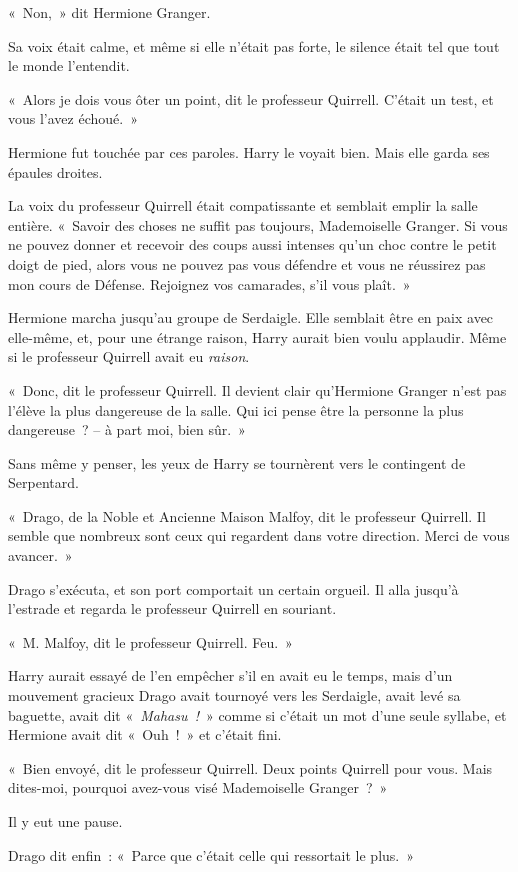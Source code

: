 «~Non,~» dit Hermione Granger.

Sa voix était calme, et même si elle n'était pas forte, le silence était tel que tout le monde l'entendit.

«~Alors je dois vous ôter un point, dit le professeur Quirrell. C'était un test, et vous l'avez échoué.~»

Hermione fut touchée par ces paroles. Harry le voyait bien. Mais elle garda ses épaules droites.

La voix du professeur Quirrell était compatissante et semblait emplir la salle entière. «~Savoir des choses ne suffit pas toujours, Mademoiselle Granger. Si vous ne pouvez donner et recevoir des coups aussi intenses qu'un choc contre le petit doigt de pied, alors vous ne pouvez pas vous défendre et vous ne réussirez pas mon cours de Défense. Rejoignez vos camarades, s'il vous plaît.~»

Hermione marcha jusqu'au groupe de Serdaigle. Elle semblait être en paix avec elle-même, et, pour une étrange raison, Harry aurait bien voulu applaudir. Même si le professeur Quirrell avait eu \emph{raison}.

«~Donc, dit le professeur Quirrell. Il devient clair qu'Hermione Granger n'est pas l'élève la plus dangereuse de la salle. Qui ici pense être la personne la plus dangereuse~? -- à part moi, bien sûr.~»

Sans même y penser, les yeux de Harry se tournèrent vers le contingent de Serpentard.

«~Drago, de la Noble et Ancienne Maison Malfoy, dit le professeur Quirrell. Il semble que nombreux sont ceux qui regardent dans votre direction. Merci de vous avancer.~»

Drago s'exécuta, et son port comportait un certain orgueil. Il alla jusqu'à l'estrade et regarda le professeur Quirrell en souriant.

«~M. Malfoy, dit le professeur Quirrell. Feu.~»

Harry aurait essayé de l'en empêcher s'il en avait eu le temps, mais d'un mouvement gracieux Drago avait tournoyé vers les Serdaigle, avait levé sa baguette, avait dit «~\emph{Mahasu~!}~» comme si c'était un mot d'une seule syllabe, et Hermione avait dit «~Ouh~!~» et c'était fini.

«~Bien envoyé, dit le professeur Quirrell. Deux points Quirrell pour vous. Mais dites-moi, pourquoi avez-vous visé Mademoiselle Granger~?~»

Il y eut une pause.

Drago dit enfin~: «~Parce que c'était celle qui ressortait le plus.~»

